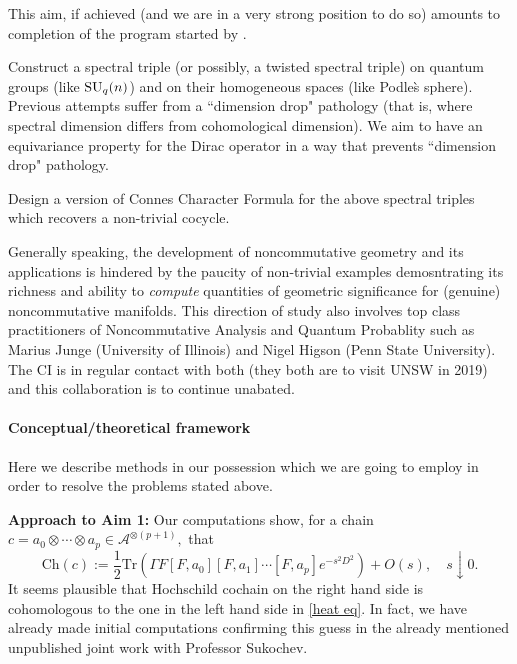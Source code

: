 \documentclass[12pt]{article}
\begin{document}
This aim, if achieved (and we are in a very strong position to do so) amounts to completion of the program started by \cite{ChakrabortyPal,Connes-suq2,NeshTus}.

 Construct a spectral triple (or possibly, a twisted spectral triple) on quantum groups (like ${\rm SU}_q(n)$) and on their homogeneous spaces (like Podle\`s sphere). Previous attempts \cite{ChakrabortyPal} suffer from a ``dimension drop" pathology (that is, where spectral dimension differs from cohomological dimension). We aim to have an equivariance property for the Dirac operator in a way that prevents ``dimension drop" pathology. 


 Design a version of Connes Character Formula for the above spectral triples which recovers a non-trivial cocycle.

Generally speaking, the development of noncommutative geometry and its applications is hindered by the paucity of non-trivial examples demosntrating its richness and ability to {\it compute} quantities of geometric significance for (genuine) noncommutative manifolds. This direction of study also involves top class practitioners of Noncommutative Analysis and Quantum Probablity such as Marius Junge (University of Illinois) and Nigel Higson (Penn State University). The CI is in regular contact with both (they both are to visit UNSW in 2019) and this collaboration is to continue unabated.


\paragraph*{Conceptual/theoretical framework} Here we describe methods in our possession which we are going to employ in order to resolve the problems stated above.

{\bf Approach to Aim 1:} Our computations show, for a chain $c=a_0\otimes\cdots\otimes a_p\in\mathcal{A}^{\otimes (p+1)},$ that
$$\mathrm{Ch}(c) := \frac{1}{2}\mathrm{Tr}(\Gamma F[F,a_0][F,a_1]\cdots[F,a_p]e^{-s^2D^2})+O(s),\quad s\downarrow 0.$$
It seems plausible that Hochschild cochain on the right hand side is cohomologous to the one in the left hand side in \eqref{heat eq}. In fact, we have already made initial computations confirming this guess in the already mentioned unpublished joint work with Professor Sukochev.
\end{document}
